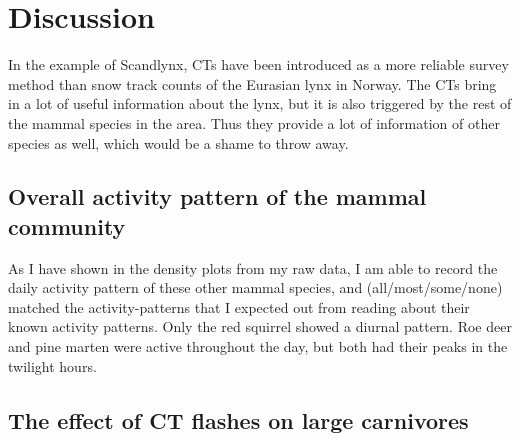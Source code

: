 \chapter{Discussion}



In the example of Scandlynx, CTs have been introduced as a more reliable survey method than snow track counts of the Eurasian lynx in Norway. The CTs bring in a lot of useful information about the lynx, but it is also triggered by the rest of the mammal species in the area. Thus they provide a lot of information of other species as well, which would be a shame to throw away.





\section{Overall activity pattern of the mammal community}

As I have shown %
in the density plots from my raw data, I am able to record the daily activity pattern of these other mammal species, and (all/most/some/none) matched the activity-patterns that I expected out from reading about their known activity patterns. %
Only the red squirrel showed a diurnal pattern. Roe deer and pine marten were active throughout the day, but both had their peaks in the twilight hours.


\section{The effect of CT flashes on large carnivores}

